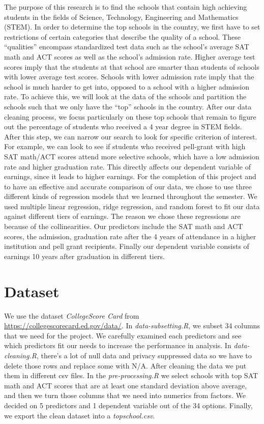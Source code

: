 \documentclass{article}
\begin{document}
  The purpose of this research is to find the schools that contain high achieving students in the fields of Science, Technology, Engineering and Mathematics (STEM).   
In order to determine the top schools in the country, we first have to set restrictions of certain categories that describe the quality of a school.
These ``qualities'' encompass standardized test data such as the school's average SAT math and ACT scores as well as the school's admission rate.  Higher average test scores imply that the students at that school are smarter than students of schools with lower average test scores.  Schools with lower admission rate imply that the school is much harder to get into, opposed to a school with a higher admission rate.
To achieve this, we will look at the data of the schools and partition the schools such that we only have the ``top'' schools in the country.  
After our data cleaning process, we focus particularly on these top schools that remain to figure out the percentage of students who received a 4 year degree in STEM fields.  
After this step, we can narrow our search to look for specific criterion of interest.  For example, we can look to see if students who received pell-grant with high SAT math/ACT scores attend more selective schools, which have a low admission rate and higher graduation rate.  This directly affects our dependent variable of earnings, since it leads to higher earnings.  
For the completion of this project and to have an effective and accurate comparison of our data, we chose to use three different kinds of regression models that we learned throughout the semester. 
We used multiple linear regression, ridge regression, and random forest to fit our data against different tiers of earnings.  The reason we chose these regressions are because of the collinearities.  Our predictors include the SAT math and ACT scores, the admission, graduation rate after the 4 years of attendance in a higher institution and pell grant recipients.  Finally our dependent variable consists of earnings 10 years after graduation in different tiers.  


\section{Dataset}

  We use the dataset \emph{CollegeScore Card} from \url{https://collegescorecard.ed.gov/data/}. In \emph{data-subsetting.R}, we subset 34 columns that we need for the project. We carefully examined each predictors and see which predictors fit our needs to increase the performance in analysis.  In \emph{data-cleaning.R},  there's a lot of null data and privacy suppressed data so we have to delete those rows and replace some with N/A. After cleaning the data we put them in different csv files. In the \emph{pre-processing.R} we select schools with top SAT math and ACT scores that are at least one standard deviation above average, and then we turn those columns that we need into numerics from factors. We decided on 5 predictors and 1 dependent variable out of the 34 options. Finally, we export the clean dataset into a \emph{topschool.csv}.
\end{document}
